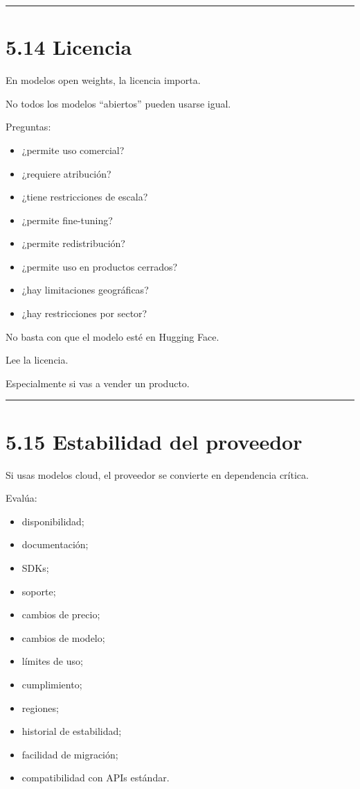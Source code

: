 \begin{center}\rule{0.5\linewidth}{0.5pt}\end{center}

\section{5.14 Licencia}\label{licencia}

En modelos open weights, la licencia importa.

No todos los modelos ``abiertos'' pueden usarse igual.

Preguntas:

\begin{itemize}
\tightlist
\item
  ¿permite uso comercial?
\item
  ¿requiere atribución?
\item
  ¿tiene restricciones de escala?
\item
  ¿permite fine-tuning?
\item
  ¿permite redistribución?
\item
  ¿permite uso en productos cerrados?
\item
  ¿hay limitaciones geográficas?
\item
  ¿hay restricciones por sector?
\end{itemize}

No basta con que el modelo esté en Hugging Face.

Lee la licencia.

Especialmente si vas a vender un producto.

\begin{center}\rule{0.5\linewidth}{0.5pt}\end{center}

\section{5.15 Estabilidad del
proveedor}\label{estabilidad-del-proveedor}

Si usas modelos cloud, el proveedor se convierte en dependencia crítica.

Evalúa:

\begin{itemize}
\tightlist
\item
  disponibilidad;
\item
  documentación;
\item
  SDKs;
\item
  soporte;
\item
  cambios de precio;
\item
  cambios de modelo;
\item
  límites de uso;
\item
  cumplimiento;
\item
  regiones;
\item
  historial de estabilidad;
\item
  facilidad de migración;
\item
  compatibilidad con APIs estándar.
\end{itemize}

